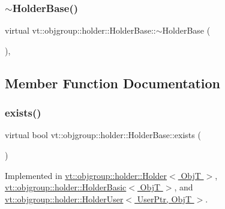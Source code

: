\subsubsection{\texorpdfstring{$\sim$\+Holder\+Base()}{~HolderBase()}}
{\footnotesize\ttfamily virtual vt\+::objgroup\+::holder\+::\+Holder\+Base\+::$\sim$\+Holder\+Base (\begin{DoxyParamCaption}{ }\end{DoxyParamCaption})\hspace{0.3cm}{\ttfamily [virtual]}, {\ttfamily [default]}}



\subsection{Member Function Documentation}
\mbox{\label{structvt_1_1objgroup_1_1holder_1_1_holder_base_afeebbe358baf0b2bfea57f52807be564}} 
\subsubsection{\texorpdfstring{exists()}{exists()}}
{\footnotesize\ttfamily virtual bool vt\+::objgroup\+::holder\+::\+Holder\+Base\+::exists (\begin{DoxyParamCaption}{ }\end{DoxyParamCaption})\hspace{0.3cm}{\ttfamily [pure virtual]}}



Implemented in \hyperlink{structvt_1_1objgroup_1_1holder_1_1_holder_a0c18e5f4287e37e6a89a72df90e68273}{vt\+::objgroup\+::holder\+::\+Holder$<$ Obj\+T $>$}, \hyperlink{structvt_1_1objgroup_1_1holder_1_1_holder_basic_ab52459a275afea84f6650d206fe5b3dc}{vt\+::objgroup\+::holder\+::\+Holder\+Basic$<$ Obj\+T $>$}, and \hyperlink{structvt_1_1objgroup_1_1holder_1_1_holder_user_abba92cc4a99e045b64a1865fe1477fb2}{vt\+::objgroup\+::holder\+::\+Holder\+User$<$ User\+Ptr, Obj\+T $>$}.

\mbox{\label{structvt_1_1objgroup_1_1holder_1_1_holder_base_a36206831fe26ea16bd7bd3079bc45a8d}} 
